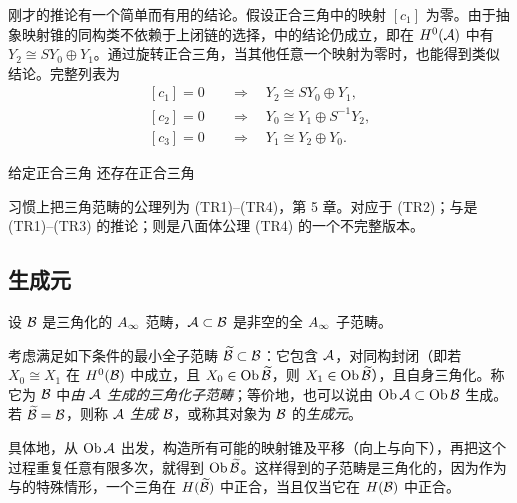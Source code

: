 \begin{note}\label{st:3.18}
刚才的推论有一个简单而有用的结论。假设正合三角中的映射 $[c_1]$ 为零。由于抽象映射锥的同构类不依赖于上闭链的选择，中的结论仍成立，即在 $H^0(\mathcal A)$ 中有 $Y_2\cong SY_0\oplus Y_1$。通过旋转正合三角，当其他任意一个映射为零时，也能得到类似结论。完整列表为
\[
\begin{aligned}
{}[c_1]=0&\quad\Longrightarrow\quad Y_2\cong SY_0\oplus Y_1,\\
[c_2]=0&\quad\Longrightarrow\quad Y_0\cong Y_1\oplus S^{-1}Y_2,\\
[c_3]=0&\quad\Longrightarrow\quad Y_1\cong Y_2\oplus Y_0.
\end{aligned}
\]
\end{note}
\begin{corollary}\label{st:3.19}
给定正合三角
还存在正合三角
\end{corollary}
习惯上把三角范畴的公理列为 (TR1)–(TR4)，第 5 章。对应于 (TR2)；与是 (TR1)–(TR3) 的推论；则是八面体公理 (TR4) 的一个不完整版本。

\subsection{生成元}\label{sec:3j}
设 $\mathcal B$ 是三角化的 $A_\infty$ 范畴，$\mathcal A\subset\mathcal B$ 是非空的全 $A_\infty$ 子范畴。
\begin{definition*}
考虑满足如下条件的最小全子范畴 $\widetilde{\mathcal B}\subset\mathcal B$：它包含 $\mathcal A$，对同构封闭（即若 $X_0\cong X_1$ 在 $H^0(\mathcal B)$ 中成立，且 $X_0\in\operatorname{Ob}\widetilde{\mathcal B}$，则 $X_1\in\operatorname{Ob}\widetilde{\mathcal B}$），且自身三角化。称它为 $\mathcal B$ 中\emph{由 $\mathcal A$ 生成的三角化子范畴}；等价地，也可以说由 $\operatorname{Ob}\mathcal A\subset\operatorname{Ob}\mathcal B$ 生成。若 $\widetilde{\mathcal B}=\mathcal B$，则称 $\mathcal A$ \emph{生成} $\mathcal B$，或称其对象为 $\mathcal B$ 的\emph{生成元}。
\end{definition*}
具体地，从 $\operatorname{Ob}\mathcal A$ 出发，构造所有可能的映射锥及平移（向上与向下），再把这个过程重复任意有限多次，就得到 $\operatorname{Ob}\widetilde{\mathcal B}$。这样得到的子范畴是三角化的，因为作为与的特殊情形，一个三角在 $H(\widetilde{\mathcal B})$ 中正合，当且仅当它在 $H(\mathcal B)$ 中正合。

